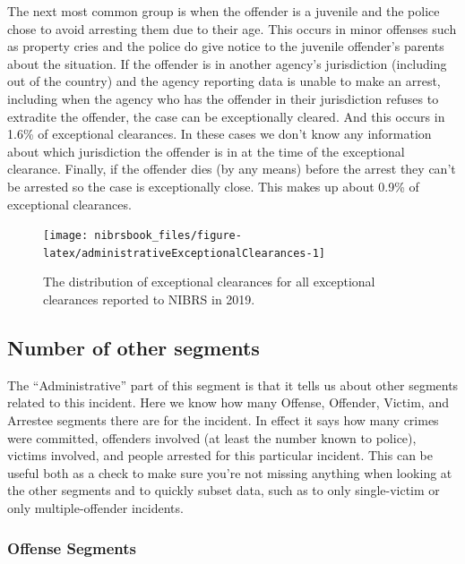 \documentclass[
  12pt,
  openany]{book}
\begin{document}
The next most common group is when the offender is a juvenile and the police chose to avoid arresting them due to their age. This occurs in minor offenses such as property cries and the police do give notice to the juvenile offender's parents about the situation. If the offender is in another agency's jurisdiction (including out of the country) and the agency reporting data is unable to make an arrest, including when the agency who has the offender in their jurisdiction refuses to extradite the offender, the case can be exceptionally cleared. And this occurs in 1.6\% of exceptional clearances. In these cases we don't know any information about which jurisdiction the offender is in at the time of the exceptional clearance. Finally, if the offender dies (by any means) before the arrest they can't be arrested so the case is exceptionally close. This makes up about 0.9\% of exceptional clearances.

\begin{figure}

{\centering \texttt{[image: nibrsbook\_files/figure-latex/administrativeExceptionalClearances-1]} 

}

\caption{The distribution of exceptional clearances for all exceptional clearances reported to NIBRS in 2019.}\label{fig:administrativeExceptionalClearances}
\end{figure}

\hypertarget{number-of-other-segments}{%
\subsection{Number of other segments}\label{number-of-other-segments}}

The ``Administrative'' part of this segment is that it tells us about other segments related to this incident. Here we know how many Offense, Offender, Victim, and Arrestee segments there are for the incident. In effect it says how many crimes were committed, offenders involved (at least the number known to police), victims involved, and people arrested for this particular incident. This can be useful both as a check to make sure you're not missing anything when looking at the other segments and to quickly subset data, such as to only single-victim or only multiple-offender incidents.

\hypertarget{offense-segments}{%
\subsubsection{Offense Segments}\label{offense-segments}}
\end{document}
